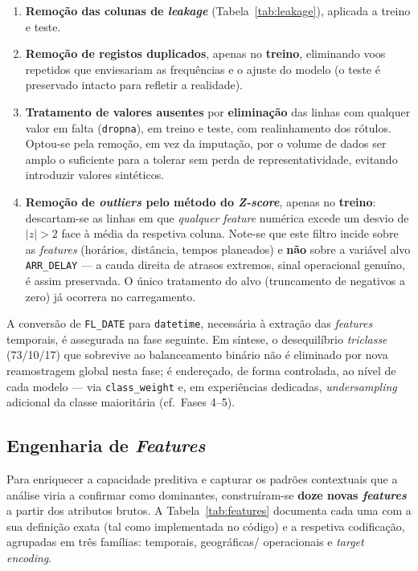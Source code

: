 \documentclass[conference]{IEEEtran}
\begin{document}
\begin{enumerate}
\item \textbf{Remoção das colunas de \textit{leakage}} (Tabela~\ref{tab:leakage}),
      aplicada a treino e teste.
\item \textbf{Remoção de registos duplicados}, apenas no \textbf{treino},
      eliminando voos repetidos que enviesariam as frequências e o ajuste do
      modelo (o teste é preservado intacto para refletir a realidade).
\item \textbf{Tratamento de valores ausentes} por \textbf{eliminação} das linhas
      com qualquer valor em falta (\texttt{dropna}), em treino e teste, com
      realinhamento dos rótulos. Optou-se pela remoção, em vez da imputação,
      por o volume de dados ser amplo o suficiente para a tolerar sem perda de
      representatividade, evitando introduzir valores sintéticos.
\item \textbf{Remoção de \textit{outliers} pelo método do \textit{Z-score}},
      apenas no \textbf{treino}: descartam-se as linhas em que \emph{qualquer}
      \textit{feature} numérica excede um desvio de $|z| > 2$ face à média da
      respetiva coluna. Note-se que este filtro incide sobre as
      \emph{features} (horários, distância, tempos planeados) e \textbf{não}
      sobre a variável alvo \texttt{ARR\_DELAY} — a cauda direita de atrasos
      extremos, sinal operacional genuíno, é assim preservada. O único
      tratamento do alvo (truncamento de negativos a zero) já ocorrera no
      carregamento.
\end{enumerate}

\noindent A conversão de \texttt{FL\_DATE} para \texttt{datetime}, necessária à
extração das \textit{features} temporais, é assegurada na fase seguinte. Em
síntese, o desequilíbrio \emph{triclasse} (73/10/17) que sobrevive ao
balanceamento binário não é eliminado por nova reamostragem global nesta fase;
é endereçado, de forma controlada, ao nível de cada modelo — via
\texttt{class\_weight} e, em experiências dedicadas, \textit{undersampling}
adicional da classe maioritária (cf.\ Fases 4–5).

\subsection{Engenharia de \textit{Features}}
Para enriquecer a capacidade preditiva e capturar os padrões contextuais que a
análise viria a confirmar como dominantes, construíram-se \textbf{doze novas
\textit{features}} a partir dos atributos brutos. A Tabela~\ref{tab:features}
documenta cada uma com a sua definição exata (tal como implementada no código)
e a respetiva codificação, agrupadas em três famílias: temporais, geográficas/
operacionais e \textit{target encoding}.
\end{document}
